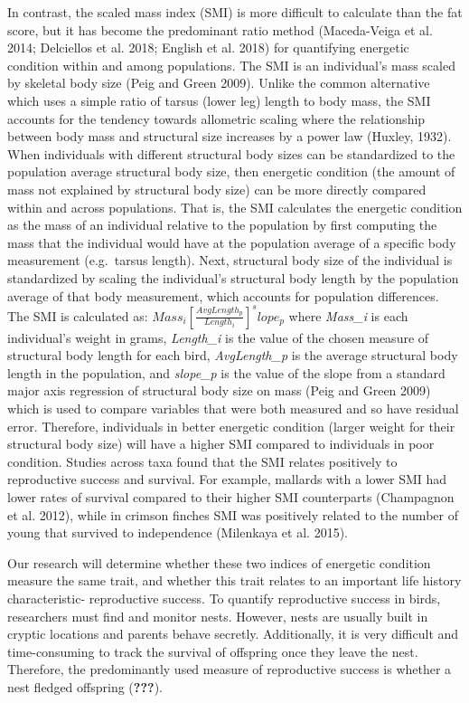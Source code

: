 \documentclass[
]{article}
\begin{document}
In contrast, the scaled mass index (SMI) is more difficult to calculate
than the fat score, but it has become the predominant ratio method
(Maceda-Veiga et al. 2014; Delciellos et al. 2018; English et al. 2018)
for quantifying energetic condition within and among populations. The
SMI is an individual's mass scaled by skeletal body size (Peig and Green
2009). Unlike the common alternative which uses a simple ratio of tarsus
(lower leg) length to body mass, the SMI accounts for the tendency
towards allometric scaling where the relationship between body mass and
structural size increases by a power law (Huxley, 1932). When
individuals with different structural body sizes can be standardized to
the population average structural body size, then energetic condition
(the amount of mass not explained by structural body size) can be more
directly compared within and across populations. That is, the SMI
calculates the energetic condition as the mass of an individual relative
to the population by first computing the mass that the individual would
have at the population average of a specific body measurement
(e.g.~tarsus length). Next, structural body size of the individual is
standardized by scaling the individual's structural body length by the
population average of that body measurement, which accounts for
population differences. The SMI is calculated as:
\(Mass_i\left[ \frac{AvgLength_p}{Length_i} \right]^slope_p\) where
\emph{Mass\_i} is each individual's weight in grams, \emph{Length\_i} is
the value of the chosen measure of structural body length for each bird,
\emph{AvgLength\_p} is the average structural body length in the
population, and \emph{slope\_p} is the value of the slope from a
standard major axis regression of structural body size on mass (Peig and
Green 2009) which is used to compare variables that were both measured
and so have residual error. Therefore, individuals in better energetic
condition (larger weight for their structural body size) will have a
higher SMI compared to individuals in poor condition. Studies across
taxa found that the SMI relates positively to reproductive success and
survival. For example, mallards with a lower SMI had lower rates of
survival compared to their higher SMI counterparts (Champagnon et al.
2012), while in crimson finches SMI was positively related to the number
of young that survived to independence (Milenkaya et al. 2015).

Our research will determine whether these two indices of energetic
condition measure the same trait, and whether this trait relates to an
important life history characteristic- reproductive success. To quantify
reproductive success in birds, researchers must find and monitor nests.
However, nests are usually built in cryptic locations and parents behave
secretly. Additionally, it is very difficult and time-consuming to track
the survival of offspring once they leave the nest. Therefore, the
predominantly used measure of reproductive success is whether a nest
fledged offspring ({\textbf{???}}).
\end{document}
